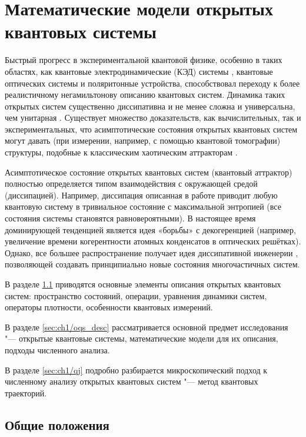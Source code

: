 \chapter{Математические модели открытых квантовых системы}\label{ch:ch1}

Быстрый прогресс в экспериментальной квантовой физике, особенно в таких областях, как квантовые электродинамические (КЭД) системы \cite{Walther2006}, квантовые оптических системы \cite{Aspelmeyer2014} и поляритонные устройства\cite{Feurer2003}, способствовал переходу к более реалистичному негамильтонову описанию квантовых систем. 
Динамика таких открытых систем существенно диссипативна и не менее сложна и универсальна, чем унитарная \cite{Diehl2008, Budich2015}. 
Существует множество доказательств, как вычислительных, так и экспериментальных, что асимптотические состояния открытых квантовых систем могут давать (при измерении, например, с помощью квантовой томографии) структуры, подобные к классическим хаотическим аттракторам \cite{Spiller1994, Brun1996, Hartmann2017, Ivanchenko2017, Carlo2017, Wang2018}. 

Асимптотическое состояние открытых квантовых систем (квантовый аттрактор) полностью определяется типом взаимодействия с окружающей средой (диссипацией). 
Например, диссипация описанная в работе \autocite{Poletti2013} приводит любую квантовую систему в тривиальное состояние с максимальной энтропией (все состояния системы становятся равновероятными).
В настоящее время доминирующей тенденцией является идея «борьбы» с декогеренцией (например, увеличение времени когерентности атомных конденсатов в оптических решётках). Однако, все большее распространение получает идея диссипативной инженерии \autocite{Diehl2008}, позволяющей создавать принципиально новые состояния многочастичных систем.

В разделе \cref{sec:ch1/common} приводятся основные элементы описания открытых квантовых систем: пространство состояний, операции, уравнения динамики систем, операторы плотности, особенности квантовых измерений.

В разделе \cref{sec:ch1/oqs_desc} рассматривается основной предмет исследования "--- открытые квантовые системы, математические модели для их описания, подходы численного анализа.
 
В разделе \cref{sec:ch1/qj} подробно разбирается микроскопический подход к численному анализу открытых квантовых систем "--- метод квантовых траекторий.

\section{Общие положения}\label{sec:ch1/common}

